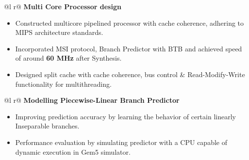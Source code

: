 \documentclass[a4paper,10pt]{article}
\begin{document}
\begin{tabularx}{\linewidth}{ @{}l r@{} }
\textbf{Multi Core Processor design} \\[2.75pt]
{
\begin{minipage}[t]{\linewidth}
    \begin{itemize}[nosep,after=\strut, leftmargin=2em, itemsep=3pt]
        \item Constructed multicore pipelined processor with cache coherence, adhering to MIPS architecture standards.
        \item Incorporated MSI protocol, Branch Predictor with BTB and achieved speed of around \textbf{60 MHz} after Synthesis.
        \item Designed split cache with cache coherence, bus control \& Read-Modify-Write functionality for multithreading.
    \end{itemize}
    \end{minipage}
}  
\end{tabularx}

\begin{tabularx}{\linewidth}{ @{}l r@{} }
\textbf{Modelling Piecewise-Linear Branch Predictor} \\[2.75pt]
{
\begin{minipage}[t]{\linewidth}
    \begin{itemize}[nosep,after=\strut, leftmargin=2em, itemsep=3pt]
        \item Improving prediction accuracy by learning the behavior of certain linearly Inseparable branches.  
        \item Performance evaluation by simulating predictor with a CPU capable of dynamic execution in Gem5 simulator. 
    \end{itemize}
    \end{minipage}
} 
\end{tabularx}
\end{document}
